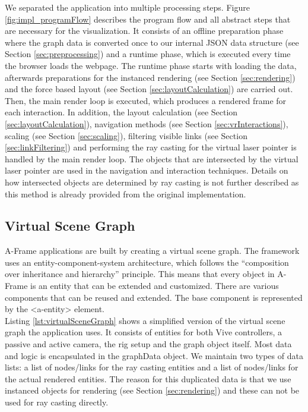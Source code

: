 We separated the application into multiple processing steps. Figure \ref{fig:impl_programFlow} describes the program flow and all abstract steps that are necessary for the visualization.
It consists of an offline preparation phase where the graph data is converted once to our internal JSON data structure (see Section \ref{sec:preprocessing}) and a runtime phase, which is executed every time the browser loads the webpage.
The runtime phase starts with loading the data, afterwards preparations for the instanced rendering (see Section \ref{sec:rendering}) and the force based layout (see Section \ref{sec:layoutCalculation}) are carried out.
Then, the main render loop is executed, which produces a rendered frame for each interaction. In addition, the layout calculation (see Section \ref{sec:layoutCalculation}), navigation methods (see Section \ref{sec:vrInteractions}), scaling (see Section \ref{sec:scaling}), filtering visible links (see Section \ref{sec:linkFiltering}) and performing the ray casting for the virtual laser pointer is handled by the main render loop.
The objects that are intersected by the virtual laser pointer are used in the navigation and interaction techniques. 
Details on how intersected objects are determined by ray casting is not further described as this method is already provided from the original implementation. 

\subsection{Virtual Scene Graph}
A-Frame applications are built by creating a virtual scene graph.
The framework uses an entity-component-system architecture, which follows the “composition over inheritance and hierarchy” principle. 
This means that every object in A-Frame is an entity that can be extended and customized.
There are various components that can be reused and extended. The base component is represented by the <a-entity> element.\\
Listing \ref{lst:virtualSceneGraph} shows a simplified version of the virtual scene graph the application uses. 
It consists of entities for both Vive controllers, a passive and active camera, the rig setup and the graph object itself.
Most data and logic is encapsulated in the graphData object. We maintain two types of data lists: a list of nodes/links for the ray casting entities and a list of nodes/links for the actual rendered entities. 
The reason for this duplicated data is that we use  instanced objects for rendering (see Section \ref{sec:rendering}) and these can not be used for ray casting directly.
\pagebreak

